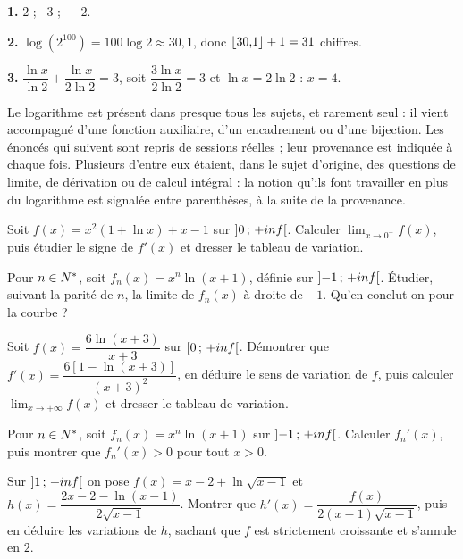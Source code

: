 \begin{corrige}
\textbf{1.} $2$ ; \ $3$ ; \ $-2$.

\textbf{2.} $\log\left(2^{100}\right) = 100\log 2 \approx 30{,}1$, donc
$\left\lfloor 30{,}1 \right\rfloor+1 = 31$ chiffres.

\textbf{3.} $\dfrac{\ln x}{\ln 2} + \dfrac{\ln x}{2\ln 2} = 3$, soit
$\dfrac{3\ln x}{2\ln 2} = 3$ et $\ln x = 2\ln 2$ : $x = 4$.
\end{corrige}

\begin{annales}
Le logarithme est présent dans presque tous les sujets, et rarement seul : il
vient accompagné d'une fonction auxiliaire, d'un encadrement ou d'une
bijection. Les énoncés qui suivent sont repris de sessions réelles ; leur
provenance est indiquée à chaque fois. Plusieurs d'entre eux étaient, dans le
sujet d'origine, des questions de limite, de dérivation ou de calcul
intégral : la notion qu'ils font travailler en plus du logarithme est signalée
entre parenthèses, à la suite de la provenance.

Soit $f(x) = x^{2}(1+\ln x)+x-1$ sur $\left]0\,;\,+inf\right[$. Calculer
$\lim_{x\to0^{+}}f(x)$, puis étudier le signe de $f'(x)$ et dresser le
tableau de variation.

Pour $n\in N^{*}$, soit $f_{n}(x) = x^{n}\ln(x+1)$, définie sur
$\left]-1\,;\,+inf\right[$. Étudier, suivant la parité de $n$, la limite de
$f_{n}(x)$ à droite de $-1$. Qu'en conclut-on pour la courbe ?

Soit $f(x) = \dfrac{6\ln(x+3)}{x+3}$ sur $\left[0\,;\,+inf\right[$.
Démontrer que $f'(x) = \dfrac{6\left[1-\ln(x+3)\right]}{(x+3)^{2}}$, en
déduire le sens de variation de $f$, puis calculer
$\lim_{x\to+\infty}f(x)$ et dresser le tableau de variation.

Pour $n\in N^{*}$, soit $f_{n}(x) = x^{n}\ln(x+1)$ sur
$\left]-1\,;\,+inf\right[$. Calculer $f_{n}'(x)$, puis montrer que
$f_{n}'(x)>0$ pour tout $x>0$.

Sur $\left]1\,;\,+inf\right[$ on pose $f(x) = x-2+\ln\sqrt{x-1}$ et
$h(x) = \dfrac{2x-2-\ln(x-1)}{2\sqrt{x-1}}$. Montrer que
$h'(x) = \dfrac{f(x)}{2(x-1)\sqrt{x-1}}$, puis en déduire les variations de
$h$, sachant que $f$ est strictement croissante et s'annule en $2$.


\end{annales}
